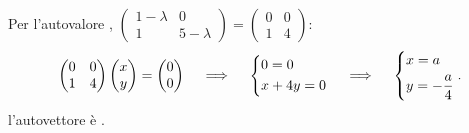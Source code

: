 \documentclass[a4paper]{report}
\begin{document}
        \paragraph{}
        Per l'autovalore ,
        $
                \begin{pmatrix}
                        1 - \lambda & 0 \\
                        1 & 5 - \lambda
                \end{pmatrix} = \begin{pmatrix}
                        0 & 0 \\
                        1 & 4
                \end{pmatrix}
        $:
        \[
                \begin{pmatrix}
                        0 & 0 \\
                        1 & 4
                \end{pmatrix}\begin{pmatrix}
                        x \\
                        y
                \end{pmatrix} = \begin{pmatrix}
                        0 \\
                        0
                \end{pmatrix} \quad \implies \quad
                \begin{dcases}
                        0  = 0 \\
                        x + 4y = 0
                \end{dcases} \quad \implies \quad
                \begin{dcases}
                        x  = a \\
                        y = - \frac{a}{4}
                \end{dcases}.
        \]
        l'autovettore \`{e} .
\end{document}
